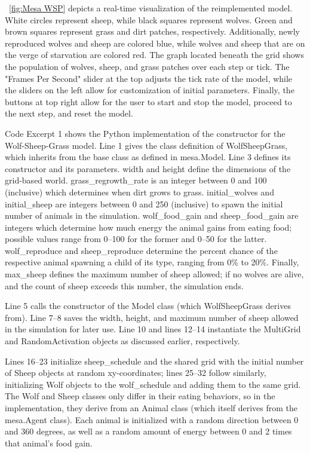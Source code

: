        ~\ref{fig:Mesa WSP} depicts a real-time visualization of the reimplemented model.
        White circles represent sheep, while black squares represent wolves.
        Green and brown squares represent grass and dirt patches, respectively.
        Additionally, newly reproduced wolves and sheep are colored blue,
        while wolves and sheep that are on the verge of starvation are colored red.
        The graph located beneath the grid shows the population of wolves, sheep,
        and grass patches over each step or tick.
        The "Frames Per Second" slider at the top adjusts the tick rate of the model,
        while the sliders on the left allow for customization of initial parameters.
        Finally, the buttons at top right allow for the user to start and stop the model,
        proceed to the next step, and reset the model.

        Code Excerpt 1 shows the Python implementation of the constructor for the
        Wolf-Sheep-Grass model.
        Line 1 gives the class definition of WolfSheepGrass,
        which inherits from the base class as defined in mesa.Model.
        Line 3 defines its constructor and its parameters.
        width and height define the dimensions of the grid-based world.
        grass\_regrowth\_rate is an integer between 0 and 100 (inclusive) which
        determines when dirt grows to grass.
        initial\_wolves and initial\_sheep are integers between 0 and 250 (inclusive)
        to spawn the initial number of animals in the simulation.
        wolf\_food\_gain and sheep\_food\_gain are integers which determine
        how much energy the animal gains from eating food;
        possible values range from 0--100 for the former and 0--50 for the latter.
        wolf\_reproduce and sheep\_reproduce determine the percent chance of the
        respective animal spawning a child of its type, ranging from 0\% to 20\%.
        Finally, max\_sheep defines the maximum number of sheep allowed;
        if no wolves are alive, and the count of sheep exceeds this number,
        the simulation ends.

        Line 5 calls the constructor of the Model class
        (which WolfSheepGrass derives from).
        Line 7--8 saves the width, height, and maximum number of sheep allowed
        in the simulation for later use.
        Line 10 and lines 12--14 instantiate the MultiGrid and RandomActivation objects
        as discussed earlier, respectively.

        Lines 16--23 initialize sheep\_schedule and the shared grid with the initial
        number of Sheep objects at random xy-coordinates;
        lines 25--32 follow similarly, initializing Wolf objects to the wolf\_schedule
        and adding them to the same grid.
        The Wolf and Sheep classes only differ in their eating behaviors,
        so in the implementation, they derive from an Animal class
        (which itself derives from the mesa.Agent class).
        Each animal is initialized with a random direction between 0 and 360 degrees,
        as well as a random amount of energy between 0 and 2 times that animal's food gain.

